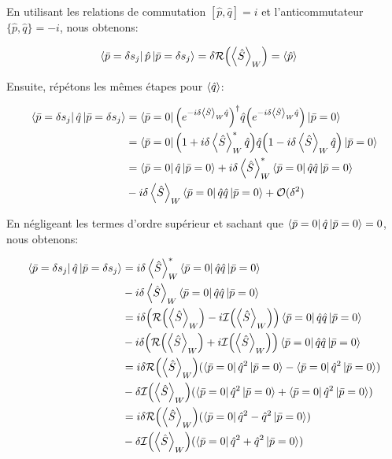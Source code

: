\begin{onehalfspace}
    \noindent En utilisant les relations de
    commutation $[\hat{p},\hat{q}] = i$ et
    l'anticommutateur $\{\hat{p},\hat{q}\} = -i$, nous obtenons:
    
    \begin{align}
        \bra{\bar{p} = \delta s_j}\hat{p}\ket{\bar{p}=\delta s_j} &= \delta\mathcal{R}\Bigl(\expval{\hat{S}}_W\Bigr) = \expval{\hat{p}}
    \end{align}

    \noindent Ensuite, répétons les mêmes étapes pour $\expval{\hat{q}}$:

    \begin{align}
        \bra{\bar{p} = \delta s_j}\hat{q}\ket{\bar{p}=\delta s_j} &= \bra{\bar{p}=0} \Bigl(e^{-i\delta \expval{\hat{S}}_W \hat{q}}\Bigr)^{\dagger} \hat{q} \Bigl(e^{-i\delta \expval{\hat{S}}_W \hat{q}}\Bigr) \ket{\bar{p}=0}\\
        &= \bra{\bar{p}=0} \Bigl(1 + i\delta \expval{\hat{S}}_W^{*} \hat{q}\Bigr) \hat{q} \Bigl(1 - i\delta \expval{\hat{S}}_W \hat{q}\Bigr) \ket{\bar{p}=0}\\
        &= \bra{\bar{p}=0} \hat{q} \ket{\bar{p}=0} + i\delta \expval{\hat{S}}_W^{*} \bra{\bar{p}=0} \hat{q}\hat{q} \ket{\bar{p}=0}\\
        &- i\delta \expval{\hat{S}}_W \bra{\bar{p}=0} \hat{q}\hat{q} \ket{\bar{p}=0} + \mathcal{O}(\delta^2)
    \end{align}

    \noindent En négligeant les termes d’ordre supérieur et sachant que  
    $\bra{\bar{p}=0}\hat{q}\ket{\bar{p}=0} = 0$, nous obtenons:

    \begin{align}
        \bra{\bar{p} = \delta s_j}\hat{q}\ket{\bar{p}=\delta s_j} &=  i\delta \expval{\hat{S}}_W^{*} \bra{\bar{p}=0} \hat{q}\hat{q} \ket{\bar{p}=0} \\
        &- i\delta \expval{\hat{S}}_W \bra{\bar{p}=0} \hat{q}\hat{q} \ket{\bar{p}=0}\\
        &= i\delta \Bigl( \mathcal{R}\Bigl(\expval{\hat{S}}_W\Bigr) - i\mathcal{I}\Bigl(\expval{\hat{S}}_W\Bigr) \Bigr) \bra{\bar{p}=0} \hat{q}\hat{q} \ket{\bar{p}=0}\\
        &- i\delta \Bigl( \mathcal{R}\Bigl(\expval{\hat{S}}_W\Bigr) + i\mathcal{I}\Bigl(\expval{\hat{S}}_W\Bigr) \Bigr) \bra{\bar{p}=0} \hat{q}\hat{q} \ket{\bar{p}=0}\\
        &= i\delta \mathcal{R}\Bigl(\expval{\hat{S}}_W\Bigr)(\bra{\bar{p} = 0}\hat{q}^2 \ket{\bar{p} = 0} - \bra{\bar{p} = 0}\hat{q}^2 \ket{\bar{p} = 0})\\
        &- \delta \mathcal{I}\Bigl(\expval{\hat{S}}_W\Bigr)(\bra{\bar{p} = 0}\hat{q}^2 \ket{\bar{p} = 0} + \bra{\bar{p} = 0}\hat{q}^2 \ket{\bar{p} = 0})\\
        &= i\delta \mathcal{R}\Bigl(\expval{\hat{S}}_W\Bigr)(\bra{\bar{p}= 0}\hat{q}^2 - \hat{q}^2\ket{\bar{p}=0})\\
        &- \delta \mathcal{I}\Bigl(\expval{\hat{S}}_W\Bigr)(\bra{\bar{p}= 0}\hat{q}^2 + \hat{q}^2\ket{\bar{p}=0})
    \end{align}


\end{onehalfspace}
